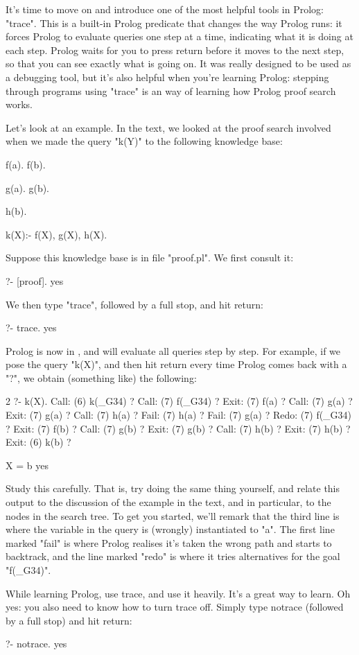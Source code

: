 It's time to move on and introduce one of the most helpful tools in
Prolog: "trace". This is a built-in
Prolog predicate that changes the
way Prolog runs: it forces Prolog to evaluate queries one step at a
time, indicating what it is doing at each step. Prolog waits for you
to press return before it moves to the next step, so that you can see
exactly what is going on. It was really designed to be used as a
debugging tool, but it's also helpful when you're learning
Prolog: stepping through programs using "trace" is an
 way of learning how Prolog proof search works.

Let's look at an example.  In the text, we looked at the proof
search involved when we made the query "k(Y)" to the following
knowledge base:
\begin{LPNcodedisplay}
f(a).
f(b).

g(a).
g(b).

h(b).

k(X):- f(X), g(X), h(X).
\end{LPNcodedisplay}

Suppose this knowledge base is in file "proof.pl". We first consult
it:
\begin{LPNcodedisplay}
?- [proof].
yes
\end{LPNcodedisplay}
%
We then type "trace", followed by a full stop,  and hit return:
\begin{LPNcodedisplay}
?- trace.
yes
\end{LPNcodedisplay}
%
Prolog is now in , and will evaluate all queries step by
step.  For example, if we pose the query "k(X)", and then hit return
every time Prolog comes back with a "?", we obtain (something like)
the following:
\begin{LPNcodedisplay}
[trace] 2 ?- k(X).
   Call: (6) k(_G34) ?
   Call: (7) f(_G34) ?
   Exit: (7) f(a) ?
   Call: (7) g(a) ?
   Exit: (7) g(a) ?
   Call: (7) h(a) ?
   Fail: (7) h(a) ?
   Fail: (7) g(a) ?
   Redo: (7) f(_G34) ?
   Exit: (7) f(b) ?
   Call: (7) g(b) ?
   Exit: (7) g(b) ?
   Call: (7) h(b) ?
   Exit: (7) h(b) ?
   Exit: (6) k(b) ?

X = b
yes
\end{LPNcodedisplay}

Study this carefully. That is, try doing the same thing yourself, and
relate this output to the discussion of the example in the text, and
in particular, to the nodes in the search tree.  To get you started,
we'll remark that the third line is where the variable in the query is
(wrongly) instantiated to "a". The first line marked "fail" is where
Prolog realises it's taken the wrong path and starts to backtrack, and
the line marked "redo" is where it tries alternatives for the goal
"f(\_G34)".

\clearpage
While learning Prolog, use trace, and use it heavily. It's a great way
to learn.
Oh yes: you also need to know how to turn trace off. Simply type
notrace (followed by a full
stop) and hit return:
\begin{LPNcodedisplay}
?- notrace.
yes
\end{LPNcodedisplay}
